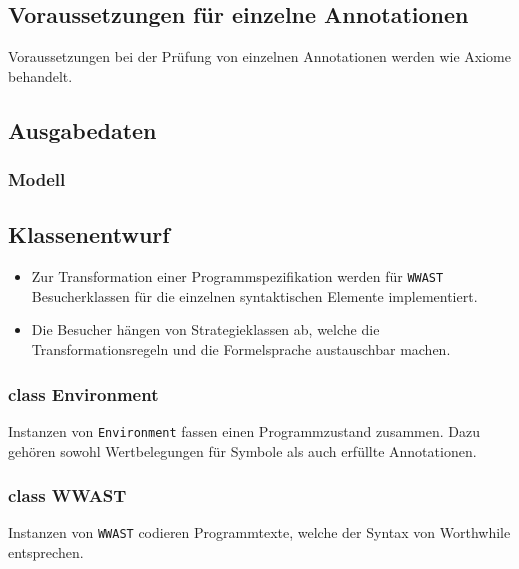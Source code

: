 \subsection{Voraussetzungen für einzelne Annotationen}%


Voraussetzungen bei der Prüfung von einzelnen Annotationen werden wie
Axiome behandelt.%

\subsection{Ausgabedaten}%

\subsubsection{Modell}%

\subsection{Klassenentwurf}%

\begin{itemize}%

    \item Zur Transformation einer Programmspezifikation werden für
    \texttt{WWAST} Besucherklassen für die einzelnen syntaktischen
    Elemente implementiert.%

    \item Die Besucher hängen von Strategieklassen ab, welche die
    Transformationsregeln und die Formelsprache austauschbar machen.%


\end{itemize}%

\subsubsection{class Environment}%

Instanzen von \texttt{Environment} fassen einen Programmzustand
zusammen. Dazu gehören sowohl Wertbelegungen für Symbole als auch
erfüllte Annotationen.%

\subsubsection{class WWAST}%

Instanzen von \texttt{WWAST} codieren Programmtexte, welche der Syntax
von Worthwhile entsprechen.%

